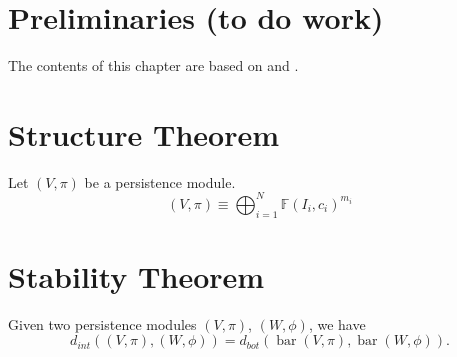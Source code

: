 \section{Preliminaries (to do work)}
The contents of this chapter are based on \cite{nanda} and \cite{polterovich}.

\begin{definition}
    
\end{definition}

\begin{definition}[Barcode]

\end{definition}

\begin{definition}
    
\end{definition}

\begin{definition}
    
\end{definition}

\begin{definition}
    
\end{definition}

\begin{definition}
    
\end{definition}

\section{Structure Theorem}
\begin{theorem}[Structure]
    Let $ (V, \pi) $ be a persistence module.
    $$
        (V, \pi) \equiv \bigoplus_{i=1}^N \mathbb F (I_i, c_i)^{m_i}
    $$
\end{theorem}

\section{Stability Theorem}
\begin{lemma}
    
\end{lemma}

\begin{theorem}[Stability]
    Given two persistence modules $ (V, \pi) $, $ (W, \phi) $, we have
    $$
        d_{int} ((V, \pi), (W, \phi)) = d_{bot} (\operatorname{bar}(V, \pi), \operatorname{bar}(W, \phi)).
    $$
\end{theorem}
